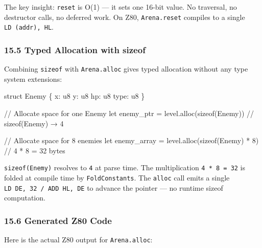 \documentclass[
  11pt,
]{article}
\newenvironment{Shaded}{\begin{snugshade}}{\end{snugshade}}
\newcommand{\NormalTok}[1]{#1}
\begin{document}
The key insight: \texttt{reset} is O(1) --- it sets one 16-bit value. No
traversal, no destructor calls, no deferred work. On Z80,
\texttt{Arena.reset} compiles to a single \texttt{LD\ (addr),\ HL}.

\hypertarget{typed-allocation-with-sizeof}{%
\subsubsection{15.5 Typed Allocation with
sizeof}\label{typed-allocation-with-sizeof}}

Combining \texttt{sizeof} with \texttt{Arena.alloc} gives typed
allocation without any type system extensions:

\begin{Shaded}
\begin{Highlighting}[]
\NormalTok{struct Enemy \{}
\NormalTok{    x: u8}
\NormalTok{    y: u8}
\NormalTok{    hp: u8}
\NormalTok{    type: u8}
\NormalTok{\}}

\NormalTok{// Allocate space for one Enemy}
\NormalTok{let enemy\_ptr = level.alloc(sizeof(Enemy))   // sizeof(Enemy) → 4}

\NormalTok{// Allocate space for 8 enemies}
\NormalTok{let enemy\_array = level.alloc(sizeof(Enemy) * 8)   // 4 * 8 = 32 bytes}
\end{Highlighting}
\end{Shaded}

\texttt{sizeof(Enemy)} resolves to \texttt{4} at parse time. The
multiplication \texttt{4\ *\ 8\ =\ 32} is folded at compile time by
\texttt{FoldConstants}. The \texttt{alloc} call emits a single
\texttt{LD\ DE,\ 32\ /\ ADD\ HL,\ DE} to advance the pointer --- no
runtime sizeof computation.

\hypertarget{generated-z80-code}{%
\subsubsection{15.6 Generated Z80 Code}\label{generated-z80-code}}

Here is the actual Z80 output for \texttt{Arena.alloc}:
\end{document}

